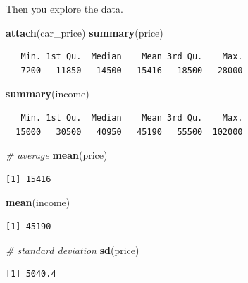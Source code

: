 \documentclass[
]{book}
\newenvironment{Shaded}{\begin{snugshade}}{\end{snugshade}}
\newcommand{\CommentTok}[1]{\textcolor[rgb]{0.56,0.35,0.01}{\textit{#1}}}
\newcommand{\KeywordTok}[1]{\textcolor[rgb]{0.13,0.29,0.53}{\textbf{#1}}}
\newcommand{\NormalTok}[1]{#1}
\begin{document}
Then you explore the data.

\begin{Shaded}
\begin{Highlighting}[]
\KeywordTok{attach}\NormalTok{(car_price)}
\KeywordTok{summary}\NormalTok{(price)}
\end{Highlighting}
\end{Shaded}

\begin{verbatim}
   Min. 1st Qu.  Median    Mean 3rd Qu.    Max. 
   7200   11850   14500   15416   18500   28000 
\end{verbatim}

\begin{Shaded}
\begin{Highlighting}[]
\KeywordTok{summary}\NormalTok{(income)}
\end{Highlighting}
\end{Shaded}

\begin{verbatim}
   Min. 1st Qu.  Median    Mean 3rd Qu.    Max. 
  15000   30500   40950   45190   55500  102000 
\end{verbatim}

\begin{Shaded}
\begin{Highlighting}[]
\CommentTok{# average}
\KeywordTok{mean}\NormalTok{(price)}
\end{Highlighting}
\end{Shaded}

\begin{verbatim}
[1] 15416
\end{verbatim}

\begin{Shaded}
\begin{Highlighting}[]
\KeywordTok{mean}\NormalTok{(income)}
\end{Highlighting}
\end{Shaded}

\begin{verbatim}
[1] 45190
\end{verbatim}

\begin{Shaded}
\begin{Highlighting}[]
\CommentTok{# standard deviation}
\KeywordTok{sd}\NormalTok{(price)}
\end{Highlighting}
\end{Shaded}

\begin{verbatim}
[1] 5040.4
\end{verbatim}
\end{document}
